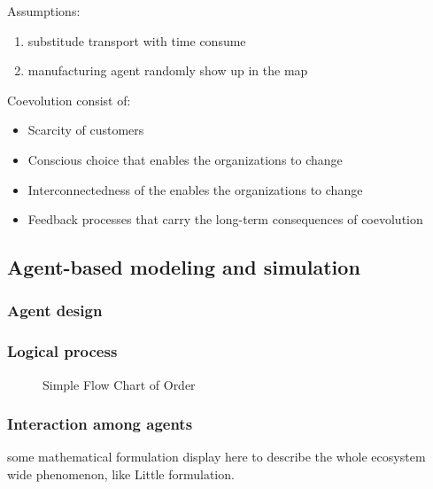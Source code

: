 Assumptions:
\begin{enumerate}
	\item substitude transport with time consume
	\item manufacturing agent randomly show up in the map
\end{enumerate}

Coevolution consist of:
\begin{itemize}
	\item Scarcity of customers
	\item Conscious choice that enables the organizations to change
	\item Interconnectedness of the enables the organizations to change
	\item Feedback processes that carry the long-term consequences of coevolution
\end{itemize}





\subsection{Agent-based modeling and simulation} %
\label{sub:agent_based_modeling_and_simulation}
\subsubsection{Agent design}

\subsubsection{Logical process}
\begin{figure}[htbp]
\centering\small
{} \hspace{0.09\textwidth}
\caption{Simple Flow Chart of Order}
\end{figure}

\subsubsection{Interaction among agents}
some mathematical formulation display here to describe the whole ecosystem wide phenomenon, like Little formulation.


